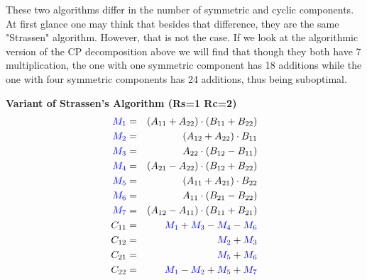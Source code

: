 \documentclass[MS]{wfuthesis}
\begin{document}
                    These two algorithms differ in the number of symmetric and cyclic components. At first glance one may think that besides that difference, they are the same "Strassen" algorithm. However, that is not the case. If we look at the algorithmic version of the CP decomposition above we will find that though they both have 7 multiplication, the one with one symmetric component has 18 additions while the one with four symmetric components has 24 additions, thus being suboptimal.

                    \newpage
                    \begin{multicols}{2}
                        \textbf{Variant of Strassen's Algorithm (Rs=1 Rc=2)}
                            \begin{eqnarray*}
                                \color{blue} M_1 & = & (A_{11} + A_{22})\cdot (B_{11} + B_{22}) \\
                                \color{blue} M_2 & = & (A_{12} + A_{22})\cdot B_{11} \\
                                \color{blue} M_3 & = & A_{22}\cdot (B_{12} - B_{11}) \\
                                \color{blue} M_4 & = & (A_{21} - A_{22})\cdot (B_{12} + B_{22}) \\
                                \color{blue} M_5 & = & (A_{11} + A_{21})\cdot B_{22} \\
                                \color{blue} M_6 & = & A_{11}\cdot (B_{21} - B_{22}) \\
                                \color{blue} M_7 & = & (A_{12} - A_{11})\cdot (B_{11} + B_{21}) \\
                                C_{11} & = & \color{blue} M_1 \color{black} + \color{blue} M_3 \color{black} - \color{blue} M_4 \color{black} - \color{blue} M_6 \\
                                C_{12} & = & \color{blue} M_2 \color{black} + \color{blue} M_3 \\
                                C_{21} & = & \color{blue} M_5 \color{black} + \color{blue} M_6 \\
                                C_{22} & = & \color{blue} M_1 \color{black} - \color{blue} M_2 \color{black} + \color{blue} M_5 \color{black} + \color{blue} M_7
                            \end{eqnarray*}

                        \columnbreak


\end{multicols}
\end{document}
